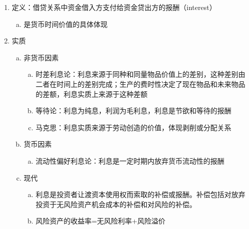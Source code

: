 \documentclass[12pt]{book}
\begin{document}
\begin{enumerate}[(1)]
    \item 定义：借贷关系中资金借入方支付给资金贷出方的报酬（interest）
          \begin{enumerate}[(a)]
              \item 是货币时间价值的具体体现
          \end{enumerate}
    \item 实质
          \begin{enumerate}[a.]
              \item 非货币因素
                    \begin{enumerate}[(a)]
                        \item 时差利息论：利息来源于同种和同量物品价值上的差别，这种差别由二者在时间上的差别完成；生产的费时性决定了现在物品和未来物品的差额，利息实质上来源于这种差额
                        \item 等待论：利息为纯息，利润为毛利息，利息是节欲和等待的报酬
                        \item 马克思：利息实质来源于劳动创造的价值，体现剥削或分配关系
                    \end{enumerate}
              \item 货币因素
                    \begin{enumerate}[(a)]
                        \item 流动性偏好利息论：利息是一定时期内放弃货币流动性的报酬
                    \end{enumerate}
              \item 现代
                    \begin{enumerate}[(a)]
                        \item 利息是投资者让渡资本使用权而索取的补偿或报酬。补偿包括对放弃投资于无风险资产机会成本的补偿和对风险的补偿。
                        \item 风险资产的收益率=无风险利率+风险溢价
                    \end{enumerate}
          \end{enumerate}
\end{enumerate}
\end{document}
